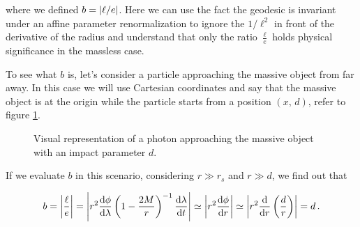 where we defined $b = \abs{\ell / e}$.
Here we can use the fact the geodesic is invariant under an affine parameter
renormalization to ignore the $1 / \ell^2$ in front of the derivative of the
radius and understand that only the ratio $\frac{\ell}{e}$ holds
physical significance in the massless case.

To see what $b$ is, let's consider a particle approaching the massive object
from far away. In this case we will use Cartesian coordinates and say that the 
massive object is at the origin while the particle starts from a position
$(x, \, d)$, refer to figure \ref{cap1:fig:b}.

\begin{figure}[h]
\centering
{}
\caption{Visual representation of a photon approaching the massive object
with an impact parameter $d$.}
\label{cap1:fig:b}
\end{figure}

If we evaluate $b$ in this scenario, considering $r \gg r_s$ and $r \gg d$, we
find out that

\begin{equation*}
    b = \abs{\frac{\ell}{e}}
    = \abs{r^2 \dv{\phi}{\lambda} \left(1-\frac{2M}{r}\right)^{-1}\dv{\lambda}{t}}
    \simeq \abs{r^2 \dv{\phi}{r}}
    \simeq \abs{r^2 \dv{}{r} \left(\frac{d}{r}\right)}
    = d \, . 
\end{equation*}

